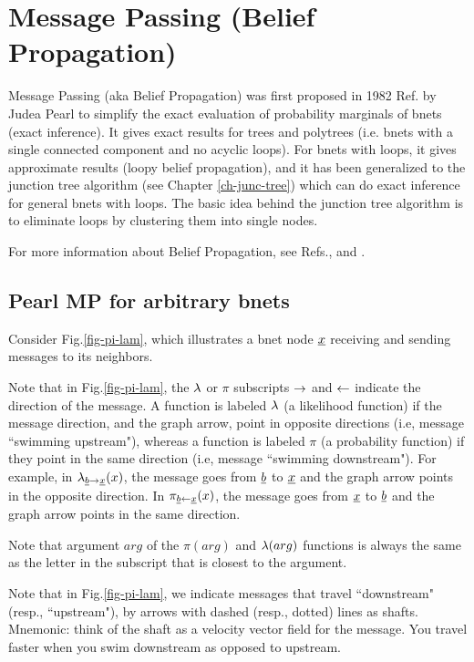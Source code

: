 \chapter{Message Passing 
(Belief Propagation)}\label{ch-mp}

Message Passing (aka Belief Propagation)
was first proposed in 1982
Ref.\cite{pearl1982reverend} by Judea Pearl
to simplify
the exact evaluation of probability marginals
of bnets (exact inference).
It gives exact results for trees and
polytrees (i.e. bnets with
a single connected component and
 no acyclic
loops). For bnets with loops,
it gives approximate results 
(loopy belief propagation),
and it has been generalized to
the junction tree algorithm 
(see Chapter \ref{ch-junc-tree})
which can do exact inference
for general bnets with loops.
The basic idea behind
the junction tree algorithm
is to eliminate 
loops by clustering
them into single nodes.

For more information
about Belief Propagation,
see Refs.\cite{wiki-mp}, \cite{pearl-1988book}
and \cite{neapolitan2004learning}.


\section*{Pearl MP for arbitrary bnets}


Consider Fig.\ref{fig-pi-lam},
which illustrates
a bnet node ${\underline{x}}$ receiving and sending
messages to its neighbors.

Note that in Fig.\ref{fig-pi-lam}, 
the $\lambda$ or $\pi$
subscripts $\rightarrow$
and $\leftarrow$
indicate  the direction of the message.
A function is labeled
$\lambda$ (a likelihood
function)  if the
message direction,
 and the  graph arrow,
 point in opposite directions
(i.e, message ``swimming upstream"),
whereas a 
function is labeled $\pi$
(a probability function)  if 
they point in the same direction
(i.e, message ``swimming downstream").
For example, in
$\lambda_{{\underline{b}}\rightarrow{\underline{x}}}(x)$,
the message goes from
${\underline{b}}$ to ${\underline{x}}$ and the 
graph arrow
points in the opposite direction.
In 
$\pi_{{\underline{b}}\leftarrow{\underline{x}}}(x)$,
the message goes from
${\underline{x}}$ to ${\underline{b}}$ and the 
graph arrow
points in the same direction.

Note that argument $arg$ of the $\pi(arg)$
and $\lambda(arg)$
functions is always the same 
as the letter in the subscript 
that is closest to the argument.

Note that in Fig.\ref{fig-pi-lam},
we indicate
messages that travel 
``downstream" 
(resp., ``upstream"), by
arrows with dashed (resp., dotted)
 lines as shafts.
Mnemonic: think of the shaft as a
 velocity vector field
for the message. 
You travel faster when
you swim downstream as opposed
to upstream.

